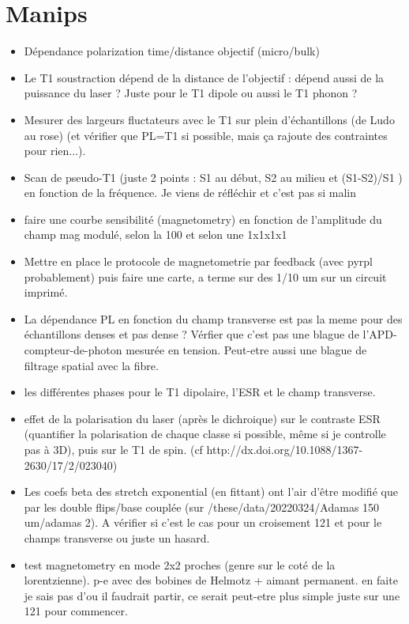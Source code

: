 \documentclass[a4paper]{report}
\begin{document}
 \section{Manips}
 \begin{itemize}
 \item Dépendance polarization time/distance objectif (micro/bulk)
 \item Le T1 soustraction dépend de la distance de l'objectif : dépend aussi de la puissance du laser ? Juste pour le T1 dipole ou aussi le T1 phonon ?
 \item Mesurer des largeurs fluctateurs avec le T1 sur plein d'échantillons (de Ludo au rose) (et vérifier que PL=T1 si possible, mais ça rajoute des contraintes pour rien...).
 \item Scan de pseudo-T1 (juste 2 points : S1 au début, S2 au milieu et (S1-S2)/S1 ) en fonction de la fréquence. Je viens de réfléchir et c'est pas si malin

 \item faire une courbe sensibilité (magnetometry) en fonction de l'amplitude du champ mag modulé, selon la 100 et selon une 1x1x1x1
 \item Mettre en place le protocole de magnetometrie par feedback (avec pyrpl probablement) puis faire une carte, a terme sur des 1/10 um sur un circuit imprimé.
 \item La dépendance PL en fonction du champ transverse est pas la meme pour des échantillons denses et pas dense ? Vérfier que c'est pas une blague de l'APD-compteur-de-photon mesurée en tension. Peut-etre aussi une blague de filtrage spatial avec la fibre.
 \item les différentes phases pour le T1 dipolaire, l'ESR et le champ transverse.
 \item effet de la polarisation du laser (après le dichroique) sur le contraste ESR (quantifier la polarisation de chaque classe si possible, même si je controlle pas à 3D), puis sur le T1 de spin. (cf http://dx.doi.org/10.1088/1367-2630/17/2/023040)
 \item Les coefs beta des stretch exponential (en fittant) ont l'air d'être modifié que par les double flips/base couplée (sur /these/data/20220324/Adamas 150 um/adamas 2). A vérifier si c'est le cas pour un croisement 121 et pour le champs transverse ou juste un hasard. 
 \item test magnetometry en mode 2x2 proches (genre sur le coté de la lorentzienne). p-e avec des bobines de Helmotz + aimant permanent. en faite je sais pas d'ou il faudrait partir, ce serait peut-etre plus simple juste sur une 121 pour commencer.
 \end{itemize}
 
\end{document}
